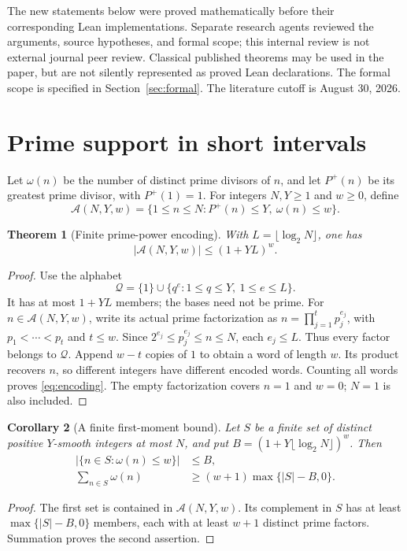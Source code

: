\documentclass[11pt]{amsart}
\newtheorem{theorem}{Theorem}[section]
\newtheorem{corollary}[theorem]{Corollary}
\theoremstyle{definition}
\theoremstyle{remark}
\begin{document}
The new statements below were proved mathematically before their
corresponding Lean implementations. Separate research agents reviewed the
arguments, source hypotheses, and formal scope; this internal review is
not external journal peer review. Classical published
theorems may be used in the paper, but are not silently represented as
proved Lean declarations. The formal scope is specified in
Section~\ref{sec:formal}. The literature cutoff is August 30, 2026.

\section{Prime support in short intervals}\label{sec:smooth}

Let $\omega(n)$ be the number of distinct prime divisors of $n$, and let
$P^+(n)$ be its greatest prime divisor, with $P^+(1)=1$.
For integers $N,Y\ge1$ and $w\ge0$, define
\[
 \mathcal A(N,Y,w)=
 \{1\le n\le N:P^+(n)\le Y,\ \omega(n)\le w\}.
\]

\begin{theorem}[Finite prime-power encoding]\label{thm:encoding}
With $L=\lfloor\log_2N\rfloor$, one has
\begin{equation}\label{eq:encoding}
 |\mathcal A(N,Y,w)|\le(1+YL)^w.
\end{equation}
\end{theorem}
\begin{proof}
Use the alphabet
\[
 \mathcal Q=\{1\}\cup\{q^e:1\le q\le Y,\ 1\le e\le L\}.
\]
It has at most $1+YL$ members; the bases need not be prime.
For $n\in\mathcal A(N,Y,w)$, write its actual prime factorization as
$n=\prod_{j=1}^t p_j^{e_j}$, with $p_1<\cdots<p_t$ and $t\le w$.
Since $2^{e_j}\le p_j^{e_j}\le n\le N$, each $e_j\le L$.
Thus every factor belongs to $\mathcal Q$. Append $w-t$ copies of $1$ to
obtain a word of length $w$. Its product recovers $n$, so different integers
have different encoded words. Counting all words proves \eqref{eq:encoding}.
The empty factorization covers $n=1$ and $w=0$; $N=1$ is also included.
\end{proof}

\begin{corollary}[A finite first-moment bound]\label{cor:moment}
Let $S$ be a finite set of distinct positive $Y$-smooth integers at most
$N$, and put $B=(1+Y\lfloor\log_2N\rfloor)^w$. Then
\begin{align}
 |\{n\in S:\omega(n)\le w\}|&\le B,\label{eq:lowcount}\\
 \sum_{n\in S}\omega(n)&\ge(w+1)\max\{|S|-B,0\}.
 \label{eq:momentfinite}
\end{align}
\end{corollary}
\begin{proof}
The first set is contained in $\mathcal A(N,Y,w)$. Its complement in $S$
has at least $\max\{|S|-B,0\}$ members, each with at least $w+1$ distinct
prime factors. Summation proves the second assertion.
\end{proof}
\end{document}
